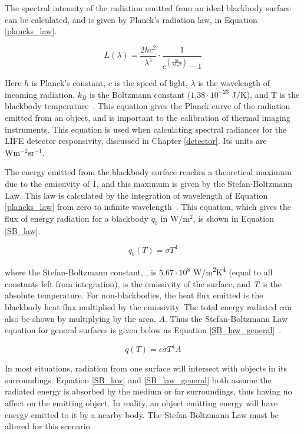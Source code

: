 The spectral intensity of the radiation emitted from an ideal blackbody surface can be calculated, and is given by Planck's radiation law, in Equation \ref{plancks_law}.

\begin{equation}\label{plancks_law}
    L(\lambda) = \frac{2hc^2}{\lambda^5}\cdot\frac{1}{e^{(\frac{hc}{\lambda k_B T})}-1}
\end{equation}

Here $h$ is Planck's constant, $c$ is the speed of light, $\lambda$ is the wavelength of incoming radiation, $k_B$ is the Boltzmann constant ($1.38\cdot 10^{-23}$ J/K), and T is the blackbody temperature~\citep{Heat_Transfer_Basics}. This equation gives the Planck curve of the radiation emitted from an object, and is important to the calibration of thermal imaging instruments. This equation is used when calculating spectral radiances for the LIFE detector responsivity, discussed in Chapter \ref{detector}. Its units are $\mathrm{Wm^{-2}sr^{-1}}$.

The energy emitted from the blackbody surface reaches a theoretical maximum due to the emissivity of 1, and this maximum is given by the Stefan-Boltzmann Law. This law is calculated by the integration of wavelength of Equation \ref{plancks_law} from zero to infinite wavelength~\citep{Heat_Transfer_Basics}. This equation, which gives the flux of energy radiation for a blackbody $q_b$ in $\mathrm{W/m^2}$, is shown in Equation \ref{SB_law}.

\begin{equation} \label{SB_law}
    q_b(T) = \sigma T^{4}
\end{equation}

where the Stefan-Boltzmann constant, \textsigma, is $5.67\cdot10^8$ W/m\textsuperscript{2}K\textsuperscript{4} (equal to all constants left from integration), {\textepsilon} is the emissivity of the surface, and \textit{T} is the absolute temperature. For non-blackbodies, the heat flux emitted is the blackbody heat flux multiplied by the emissivity. The total energy radiated can also be shown by multiplying by the area, $A$. Thus the Stefan-Boltzmann Law equation for general surfaces is given below as Equation \ref{SB_law_general}~\citep{Heat_Transfer_Basics}.

\begin{equation} \label{SB_law_general}
    q(T) = \epsilon \sigma T^{4} A
\end{equation}

In most situations, radiation from one surface will intersect with objects in its surroundings. Equation \ref{SB_law} and \ref{SB_law_general} both assume the radiated energy is absorbed by the medium or far surroundings, thus having no affect on the emitting object. In reality, an object emitting energy will have energy emitted to it by a nearby body. The Stefan-Boltzmann Law must be altered for this scenario.

